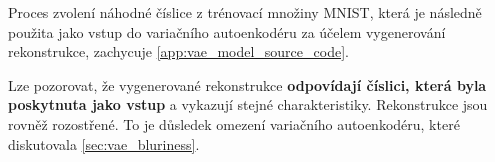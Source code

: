 Proces zvolení náhodné číslice z trénovací množiny MNIST, která je následně použita jako vstup do variačního autoenkodéru za účelem vygenerování rekonstrukce, zachycuje \autoref{app:vae_model_source_code}.

Lze pozorovat, že vygenerované rekonstrukce \textbf{odpovídají číslici, která byla poskytnuta jako vstup} a vykazují stejné charakteristiky.
Rekonstrukce jsou rovněž rozostřené. To je důsledek omezení variačního autoenkodéru, které diskutovala \autoref{sec:vae_bluriness}. 

